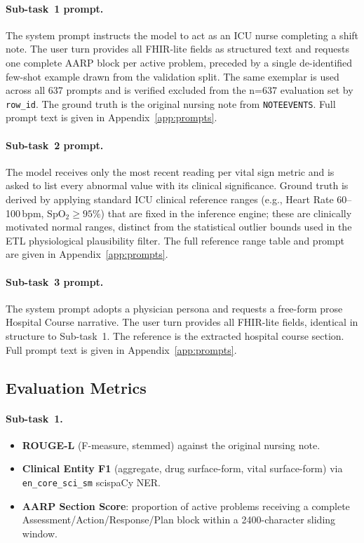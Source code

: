 \documentclass[sigconf,anonymous=false,review=false]{acmart}
\begin{document}
\paragraph{Sub-task~1 prompt.} The system prompt instructs the model to act as
an ICU nurse completing a shift note. The user turn provides all FHIR-lite
fields as structured text and requests one complete AARP block per active
problem, preceded by a single de-identified few-shot example drawn from the
validation split. The same exemplar is used across all 637 prompts and is
verified excluded from the n=637 evaluation set by \texttt{row\_id}.
The ground truth is the original nursing note from \texttt{NOTEEVENTS}.
Full prompt text is given in Appendix~\ref{app:prompts}.

\paragraph{Sub-task~2 prompt.} The model receives only the most recent reading
per vital sign metric and is asked to list every abnormal value with its
clinical significance. Ground truth is derived by applying standard ICU
clinical reference ranges (e.g., Heart Rate 60--100\,bpm, SpO$_2 \geq 95$\%)
that are fixed in the inference engine; these are clinically motivated normal
ranges, distinct from the statistical outlier bounds used in the ETL
physiological plausibility filter. The full reference range table and prompt
are given in Appendix~\ref{app:prompts}.

\paragraph{Sub-task~3 prompt.} The system prompt adopts a physician persona
and requests a free-form prose Hospital Course narrative. The user turn
provides all FHIR-lite fields, identical in structure to Sub-task~1.
The reference is the extracted hospital course section. Full prompt text
is given in Appendix~\ref{app:prompts}.

\subsection{Evaluation Metrics}

\paragraph{Sub-task~1.}
\begin{itemize}
  \item \textbf{ROUGE-L} (F-measure, stemmed) against the original nursing note.
  \item \textbf{Clinical Entity F1} (aggregate, drug surface-form, vital
    surface-form) via \texttt{en\_core\_sci\_sm} scispaCy NER.
  \item \textbf{AARP Section Score}: proportion of active problems receiving a
    complete Assessment/Action/Response/Plan block within a 2400-character
    sliding window.
\end{itemize}
\end{document}
